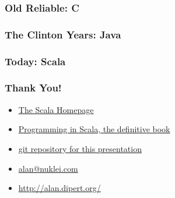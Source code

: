 \documentclass[hyperref={colorlinks=true}]{beamer}
\begin{document}
\begin{frame} 
\frametitle{Old Reliable: C}
\tt\tiny{

}
\end{frame} 

\begin{frame} 
\frametitle{The Clinton Years: Java}
\tt\tiny{

}
\end{frame} 

\begin{frame} 
\frametitle{Today: Scala}
\tt\tiny{

}
\end{frame} 

\begin{frame} 
\frametitle{Thank You!}
\begin{itemize}
  \item<1-> \href{http://www.scala-lang.org/}{The Scala Homepage}
  \item<1-> \href{http://www.artima.com/shop/programming_in_scala}{Programming in Scala, the definitive book}
  \item<1-> \href{http://github.com/alandipert/scala-presentation/tree/master}{git repository for this presentation}
\end{itemize}
\begin{itemize}
  \item<1-> \href{mailto:alan@nuklei.com}{alan@nuklei.com}
  \item<1-> \href{http://alan.dipert.org/}{http://alan.dipert.org/}
\end{itemize}
\end{frame} 
\end{document}
